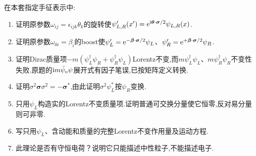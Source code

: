\begin{exercise}
在本套指定手征表示中:
\begin{enumerate}[label=(\alph*)]
\item 证明原参数$\omega_{ij}=\epsilon_{ijk}\theta_k$的旋转使$\psi'_{L,R}(x')=\mathrm e^{\mathrm i\boldsymbol\theta\cdot\boldsymbol\sigma/2}\psi_{L,R}(x)$.
\item 证明原参数$\omega_{0i}=\beta_i$的boost使$\psi'_L=\mathrm e^{-\boldsymbol\beta\cdot\boldsymbol\sigma/2}\psi_L$、$\psi'_R=\mathrm e^{+\boldsymbol\beta\cdot\boldsymbol\sigma/2}\psi_R$.
\item 证明Dirac质量项$-m(\psi_L^\dagger\psi_R+\psi_R^\dagger\psi_L)$Lorentz不变,而$m\psi_L^\dagger\psi_L$、$m\psi_R^\dagger\psi_R$不变性失败.原题的$\mathrm i m\bar\psi_{\rm o}\psi$展开式有因子笔误,已按矩阵定义转换.
\item 证明$\sigma^2\boldsymbol\sigma\sigma^2=-\boldsymbol\sigma^*$,由此证明$\sigma^2\psi_L^*$按$\psi_R$变换.
\item 只用$\psi_L$构造实的Lorentz不变质量项.证明普通可交换分量使它恒零,反对易分量则可非零.
\item 写只用$\psi_L$、含动能和质量的完整Lorentz不变作用量及运动方程.
\item 此理论是否有守恒电荷？说明它只能描述中性粒子,不能描述电子.
\end{enumerate}
\end{exercise}
